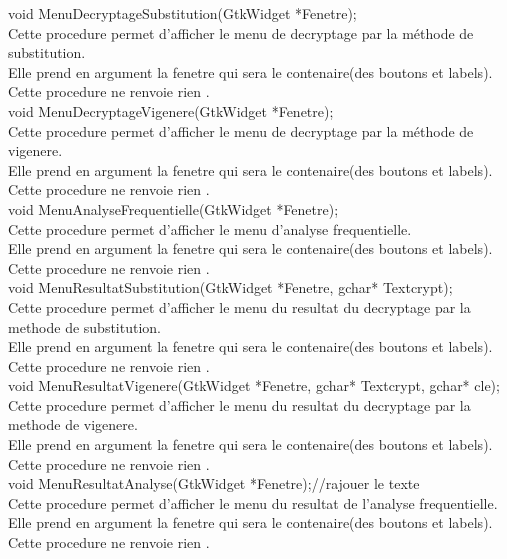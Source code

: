 \documentclass[a4]{article}
\begin{document}
	void MenuDecryptageSubstitution(GtkWidget *Fenetre);\\
		Cette procedure permet d'afficher le menu de decryptage par la méthode de substitution.\\
		Elle prend en argument la fenetre qui sera le contenaire(des boutons et labels).\\
		Cette procedure ne renvoie rien .\\
	
	void MenuDecryptageVigenere(GtkWidget *Fenetre);\\
		Cette procedure permet d'afficher le menu de decryptage par la méthode de vigenere.\\
		Elle prend en argument la fenetre qui sera le contenaire(des boutons et labels).\\
		Cette procedure ne renvoie rien .\\
	
	void MenuAnalyseFrequentielle(GtkWidget *Fenetre);\\
		Cette procedure permet d'afficher le menu d'analyse frequentielle.\\
		Elle prend en argument la fenetre qui sera le contenaire(des boutons et labels).\\
		Cette procedure ne renvoie rien .\\
	
	void MenuResultatSubstitution(GtkWidget *Fenetre, gchar* Textcrypt);\\
		Cette procedure permet d'afficher le menu du resultat du decryptage par la methode de substitution.\\
		Elle prend en argument la fenetre qui sera le contenaire(des boutons et labels).\\
		Cette procedure ne renvoie rien .\\
	
	void MenuResultatVigenere(GtkWidget *Fenetre, gchar* Textcrypt, gchar* cle);\\
		Cette procedure permet d'afficher le menu du resultat du decryptage par la methode de vigenere.\\
		Elle prend en argument la fenetre qui sera le contenaire(des boutons et labels).\\
		Cette procedure ne renvoie rien .\\
	
	void MenuResultatAnalyse(GtkWidget *Fenetre);//rajouer le texte\\
		Cette procedure permet d'afficher le menu du resultat de l'analyse frequentielle.\\
		Elle prend en argument la fenetre qui sera le contenaire(des boutons et labels).\\
		Cette procedure ne renvoie rien .\\
	
\end{document}
